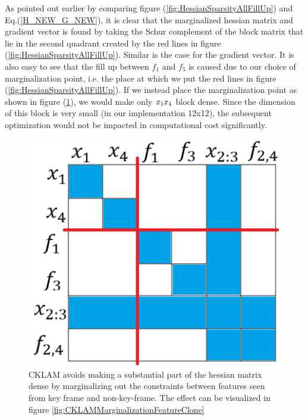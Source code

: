 As pointed out earlier by comparing figure (\ref{fig:HessianSparsityAllFillUp}) and Eq.(\ref{H_NEW_G_NEW}), it is clear that the marginalized hessian matrix and gradient vector is found by taking the Schur complement of the block matrix that lie in the second quadrant created by the red lines in figure (\ref{fig:HessianSparsityAllFillUp}). Similar is the case for the gradient vector. It is also easy to see that the fill up between $f_1$ and $f_5$ is caused due to our choice of marginalization point, i.e. the place at which we put the red lines in figure (\ref{fig:HessianSparsityAllFillUp}). If we instead place the marginalization point as shown in figure (\ref{fig:HessianSparsityAllFillUpKeepSparsity}), we would make only $x_1\-x_4$ block dense. Since the dimension of this block is very small (in our implementation 12x12), the subsequent optimization would not be impacted in computational cost significantly.

\begin{figure}[ht]
	\centering
		\includegraphics[width=1.00\textwidth]{images/HessianSparsityAllFillUpKeepSparsity.png}
  \caption{CKLAM avoids making a substantial part of the hessian matrix dense by marginalizing out the constraints between features seen from key frame and non-key-frame. The effect can be visualized in figure \ref{fig:CKLAMMarginalizationFeatureClone}}
  \label{fig:HessianSparsityAllFillUpKeepSparsity}
\end{figure}

